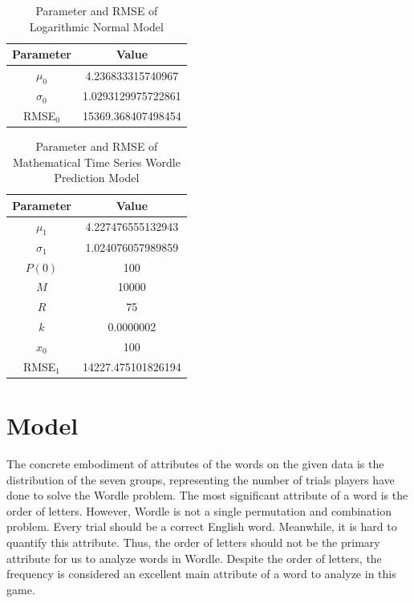 \documentclass[12pt]{article}
\begin{document}
\begin{table}[h]
    \centering
    \begin{tabular}{|c|c|}
    \hline
    \textbf{Parameter} & \textbf{Value}     \\ \hline
    $\mu_0$            & 4.236833315740967  \\ \hline
    $\sigma_0$         & 1.0293129975722861 \\ \hline
    RMSE$_0$          & 15369.368407498454 \\ \hline
    \end{tabular}
    \caption{Parameter and RMSE of Logarithmic Normal Model}
    \label{table2}
\end{table}

\begin{table}[h]
    \centering
    \begin{tabular}{|c|c|}
    \hline
    \textbf{Parameter} & \textbf{Value}     \\ \hline
    $\mu_1$            & 4.227476555132943  \\ \hline
    $\sigma_1$         & 1.024076057989859  \\ \hline
    $P(0)$             & 100                \\ \hline
    $M$                & 10000              \\ \hline
    $R$                & 75                 \\ \hline
    $k$                & 0.0000002          \\ \hline
    $x_0$              & 100                \\ \hline
    RMSE$_1$          & 14227.475101826194 \\ \hline
    \end{tabular}
    \caption{Parameter and RMSE of Mathematical Time Series Wordle Prediction Model}
    \label{table3}
\end{table}

\section{Model \uppercase\expandafter{}}

The concrete embodiment of attributes of the words on the given data is the distribution of the seven groups, representing the number of trials players have done to solve the Wordle problem. The most significant attribute of a word is the order of letters. However, Wordle is not a single permutation and combination problem. Every trial should be a correct English word. Meanwhile, it is hard to quantify this attribute. Thus, the order of letters should not be the primary attribute for us to analyze words in Wordle. Despite the order of letters, the frequency is considered an excellent main attribute of a word to analyze in this game. 
\end{document}
